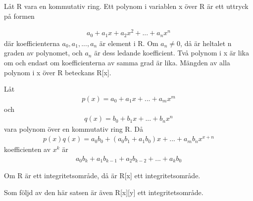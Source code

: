 \begin{definition}
Låt R vara en kommutativ ring. Ett polynom i variablen x över R är ett uttryck på formen

\begin{align*}
 a_0+a_1x+a_2x^2+...+a_nx^n
\end{align*}
där koefficienterna $a_0, a_1,...,a_n$ är element i R. Om $a_n \neq 0$, då är heltalet n graden av polynomet, och $a_n$ är dess ledande koefficient. Två polynom i x är lika om och endast om
koefficienterna av samma grad är lika. Mängden av alla polynom i x över R beteckans R[x].

\end{definition}

\begin{definition}
 Låt
\begin{align*}
 p(x)=a_0+a_1x+...+a_mx^m
\end{align*}
och
\begin{align*}
 q(x)=b_0+b_1x+...+b_nx^n
\end{align*}
vara polynom över en kommutativ ring R. Då
\begin{align*}
 p(x)q(x)=a_0b_0+(a_0b_1+a_1b_0)x+...+a_mb_nx^{x+n}
\end{align*}
koefficienten av $x^k$ är
\begin{align*}
 a_0b_k+a_1b_{k-1}+a_2b_{k-2}+...+a_kb_0
\end{align*}

\end{definition}

\begin{theorem}
 Om R är ett integritetsområde, då är R[x] ett integritetsområde.
\end{theorem}

Som följd av den här satsen är även R[x][y] ett integritetsområde.

